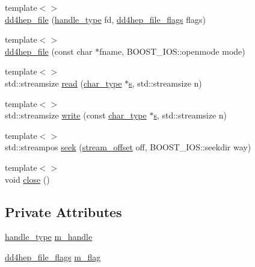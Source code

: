 \begin{DoxyCompactItemize}
\item 
{\footnotesize template$<$$>$ }\\\hyperlink{class_d_d4hep_1_1dd4hep__file_a8e16cedfefc87907ac964b73fbe59952}{dd4hep\_\-file} (\hyperlink{class_t}{handle\_\-type} fd, \hyperlink{namespace_d_d4hep_a31d19f9b0ce567067d2897fbda1761e5}{dd4hep\_\-file\_\-flags} flags)
\item 
{\footnotesize template$<$$>$ }\\\hyperlink{class_d_d4hep_1_1dd4hep__file_a8af2b1baf80935d2a9b34704c49e51d8}{dd4hep\_\-file} (const char $\ast$fname, BOOST\_\-IOS::openmode mode)
\item 
{\footnotesize template$<$$>$ }\\std::streamsize \hyperlink{class_d_d4hep_1_1dd4hep__file_a1a6c8a07e5820c20c8aa7b959dc51ff9}{read} (\hyperlink{class_d_d4hep_1_1dd4hep__file_aef4242f7f2fe15a59f7bf7a8f6ba24d5}{char\_\-type} $\ast$\hyperlink{_volumes_8cpp_a17ca6bfc8040d695d3cada22a4763d40}{s}, std::streamsize n)
\item 
{\footnotesize template$<$$>$ }\\std::streamsize \hyperlink{class_d_d4hep_1_1dd4hep__file_aa79fcf34ccb19554db07c5ccb604a9fa}{write} (const \hyperlink{class_d_d4hep_1_1dd4hep__file_aef4242f7f2fe15a59f7bf7a8f6ba24d5}{char\_\-type} $\ast$\hyperlink{_volumes_8cpp_a17ca6bfc8040d695d3cada22a4763d40}{s}, std::streamsize n)
\item 
{\footnotesize template$<$$>$ }\\std::streampos \hyperlink{class_d_d4hep_1_1dd4hep__file_afcc295b107f64a56443fa949df98c80d}{seek} (\hyperlink{class_d_d4hep_1_1dd4hep__file_a28e1531542193871075e8b7f47818113}{stream\_\-offset} off, BOOST\_\-IOS::seekdir way)
\item 
{\footnotesize template$<$$>$ }\\void \hyperlink{class_d_d4hep_1_1dd4hep__file_a9ff7065205d26c640fff6923fc50485d}{close} ()
\end{DoxyCompactItemize}
\subsection*{Private Attributes}
\begin{DoxyCompactItemize}
\item 
\hyperlink{class_t}{handle\_\-type} \hyperlink{class_d_d4hep_1_1dd4hep__file_a198f202b4b952426543a8df41a21a232}{m\_\-handle}
\item 
\hyperlink{namespace_d_d4hep_a31d19f9b0ce567067d2897fbda1761e5}{dd4hep\_\-file\_\-flags} \hyperlink{class_d_d4hep_1_1dd4hep__file_ae278513f83e549eda9cf0e01998a6726}{m\_\-flag}
\end{DoxyCompactItemize}
